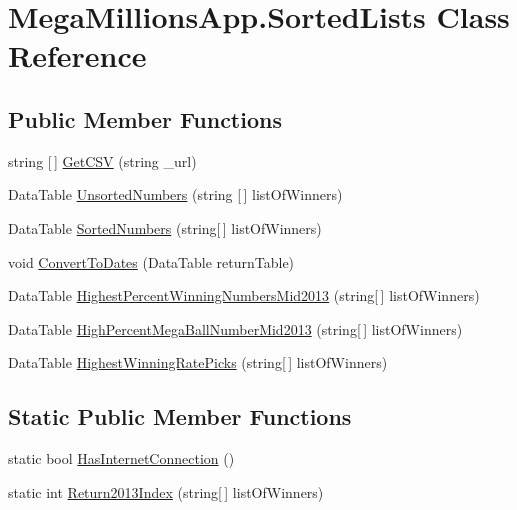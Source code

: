 \hypertarget{class_mega_millions_app_1_1_sorted_lists}{}\section{Mega\+Millions\+App.\+Sorted\+Lists Class Reference}
\label{class_mega_millions_app_1_1_sorted_lists}
\subsection*{Public Member Functions}
\begin{DoxyCompactItemize}
\item 
string \mbox{[}$\,$\mbox{]} \hyperlink{class_mega_millions_app_1_1_sorted_lists_a502654e22b2713c20cba8c1fe96e6acb}{Get\+C\+SV} (string \+\_\+url)
\item 
Data\+Table \hyperlink{class_mega_millions_app_1_1_sorted_lists_a6f58a14ae2f3c8eeb3e8bf97d8ac892d}{Unsorted\+Numbers} (string \mbox{[}$\,$\mbox{]} list\+Of\+Winners)
\item 
Data\+Table \hyperlink{class_mega_millions_app_1_1_sorted_lists_a9c9fa2af47c2ab0a569428003a2868dc}{Sorted\+Numbers} (string\mbox{[}$\,$\mbox{]} list\+Of\+Winners)
\item 
void \hyperlink{class_mega_millions_app_1_1_sorted_lists_a94dc4cadd73ec7120efd0a9408ac7612}{Convert\+To\+Dates} (Data\+Table return\+Table)
\item 
Data\+Table \hyperlink{class_mega_millions_app_1_1_sorted_lists_a0beccf7393a4c79de2a72a48ad52f609}{Highest\+Percent\+Winning\+Numbers\+Mid2013} (string\mbox{[}$\,$\mbox{]} list\+Of\+Winners)
\item 
Data\+Table \hyperlink{class_mega_millions_app_1_1_sorted_lists_a3630882f1d173c776aa565ac1eb32379}{High\+Percent\+Mega\+Ball\+Number\+Mid2013} (string\mbox{[}$\,$\mbox{]} list\+Of\+Winners)
\item 
Data\+Table \hyperlink{class_mega_millions_app_1_1_sorted_lists_aa0b262afc733b818783de0e0d67628f1}{Highest\+Winning\+Rate\+Picks} (string\mbox{[}$\,$\mbox{]} list\+Of\+Winners)
\end{DoxyCompactItemize}
\subsection*{Static Public Member Functions}
\begin{DoxyCompactItemize}
\item 
static bool \hyperlink{class_mega_millions_app_1_1_sorted_lists_abca9f3e2b6352a23bef4b1e307390254}{Has\+Internet\+Connection} ()
\item 
static int \hyperlink{class_mega_millions_app_1_1_sorted_lists_a7f3f872ccebb8e2958facdbfeedebb4a}{Return2013\+Index} (string\mbox{[}$\,$\mbox{]} list\+Of\+Winners)
\end{DoxyCompactItemize}

